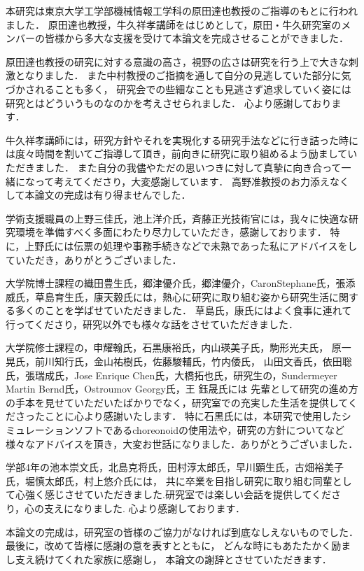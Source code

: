 
本研究は東京大学工学部機械情報工学科の原田達也教授のご指導のもとに行われました．
原田達也教授，牛久祥孝講師をはじめとして，原田・牛久研究室のメンバーの皆様から多大な支援を受けて本論文を完成させることができました．

原田達也教授の研究に対する意識の高さ，視野の広さは研究を行う上で大きな刺激となりました．
また中村教授のご指摘を通して自分の見逃していた部分に気づかされることも多く，
研究会での些細なことも見逃さず追求していく姿には研究とはどういうものなのかを考えさせられました．
心より感謝しております．

牛久祥孝講師には，研究方針やそれを実現化する研究手法などに行き詰った時には度々時間を割いてご指導して頂き，前向きに研究に取り組めるよう励ましていただきました．
また自分の我儘やただの思いつきに対して真摯に向き合って一緒になって考えてくださり，大変感謝しています．
高野准教授のお力添えなくして本論文の完成は有り得ませんでした．


学術支援職員の上野三佳氏，池上洋介氏，斉藤正光技術官には，我々に快適な研究環境を準備すべく多面にわたり尽力していただき，感謝しております．
特に，上野氏には伝票の処理や事務手続きなどで未熟であった私にアドバイスをしていただき，ありがとうございました．

大学院博士課程の織田豊生氏，郷津優介氏，郷津優介，CaronStephane氏，張添威氏，草島育生氏，康天毅氏には，熱心に研究に取り組む姿から研究生活に関する多くのことを学ばせていただきました．
草島氏，康氏にはよく食事に連れて行ってくださり，研究以外でも様々な話をさせていただきました．

大学院修士課程の，申耀翰氏，石黒康裕氏，内山瑛美子氏，駒形光夫氏，
原一晃氏，前川知行氏，金山祐樹氏，佐藤駿輔氏，竹内倭氏，
山田文香氏，依田聡氏，張瑞成氏，Jose Enrique Chen氏，大橋拓也氏，研究生の，Sundermeyer Martin Bernd氏，Ostroumov Georgy氏，王 鈺晟氏には
先輩として研究の進め方の手本を見せていただいたばかりでなく，研究室での充実した生活を提供してくださったことに心より感謝いたします．
特に石黒氏には，本研究で使用したシミュレーションソフトであるchoreonoidの使用法や，研究の方針についてなど様々なアドバイスを頂き，大変お世話になりました．ありがとうございました．

学部4年の池本崇文氏，北島克将氏，田村淳太郎氏，早川顕生氏，古畑裕美子氏，堀慎太郎氏，村上悠介氏には，
共に卒業を目指し研究に取り組む同輩として心強く感じさせていただきました.研究室では楽しい会話を提供してくださり，心の支えになりました.
心より感謝しております．

本論文の完成は，研究室の皆様のご協力がなければ到底なしえないものでした．
最後に，改めて皆様に感謝の意を表すとともに，
どんな時にもあたたかく励まし支え続けてくれた家族に感謝し，
本論文の謝辞とさせていただきます．


